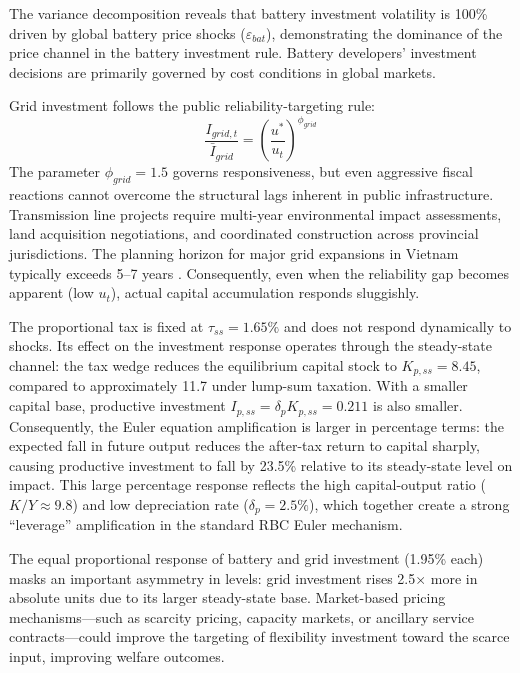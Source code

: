 \documentclass[12pt, a4paper]{article}
\begin{document}
The variance decomposition reveals that battery investment volatility is 100\% driven by global battery price shocks ($\varepsilon_{bat}$), demonstrating the dominance of the price channel in the battery investment rule. Battery developers' investment decisions are primarily governed by cost conditions in global markets.

Grid investment follows the public reliability-targeting rule:
\begin{equation}
\frac{I_{grid,t}}{\bar{I}_{grid}} = \left(\frac{u^*}{u_t}\right)^{\phi_{grid}}
\end{equation}
The parameter $\phi_{grid} = 1.5$ governs responsiveness, but even aggressive fiscal reactions cannot overcome the structural lags inherent in public infrastructure. Transmission line projects require multi-year environmental impact assessments, land acquisition negotiations, and coordinated construction across provincial jurisdictions. The planning horizon for major grid expansions in Vietnam typically exceeds 5--7 years \citep{iea2023}. Consequently, even when the reliability gap becomes apparent (low $u_t$), actual capital accumulation responds sluggishly.

The proportional tax is fixed at $\tau_{ss} = 1.65\%$ and does not respond dynamically to shocks. Its effect on the investment response operates through the steady-state channel: the tax wedge reduces the equilibrium capital stock to $K_{p,ss} = 8.45$, compared to approximately 11.7 under lump-sum taxation. With a smaller capital base, productive investment $I_{p,ss} = \delta_p K_{p,ss} = 0.211$ is also smaller. Consequently, the Euler equation amplification is larger in percentage terms: the expected fall in future output reduces the after-tax return to capital sharply, causing productive investment to fall by 23.5\% relative to its steady-state level on impact. This large percentage response reflects the high capital-output ratio ($K/Y \approx 9.8$) and low depreciation rate ($\delta_p = 2.5\%$), which together create a strong ``leverage'' amplification in the standard RBC Euler mechanism.

The equal proportional response of battery and grid investment (1.95\% each) masks an important asymmetry in levels: grid investment rises 2.5$\times$ more in absolute units due to its larger steady-state base. Market-based pricing mechanisms---such as scarcity pricing, capacity markets, or ancillary service contracts---could improve the targeting of flexibility investment toward the scarce input, improving welfare outcomes.
\end{document}
